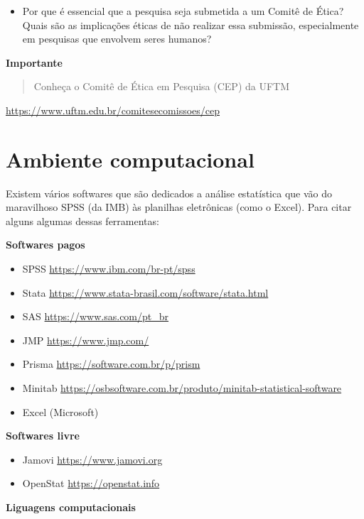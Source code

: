 \documentclass[
]{book}
\providecommand{\tightlist}{%
  \setlength{\itemsep}{0pt}\setlength{\parskip}{0pt}}
\begin{document}
\begin{enumerate}
  \begin{itemize}
  \tightlist
  \item
    Por que é essencial que a pesquisa seja submetida a um Comitê de Ética? Quais são as implicações éticas de não realizar essa submissão, especialmente em pesquisas que envolvem seres humanos?
  \end{itemize}
\end{enumerate}

\textbf{Importante}

\begin{quote}
Conheça o Comitê de Ética em Pesquisa (CEP) da UFTM
\end{quote}

\url{https://www.uftm.edu.br/comitesecomissoes/cep}

\chapter{Ambiente computacional}\label{ambiente-computacional}

Existem vários softwares que são dedicados a análise estatística que vão do maravilhoso SPSS (da IMB) às planilhas eletrônicas (como o Excel). Para citar alguns algumas dessas ferramentas:

\textbf{Softwares pagos}

\begin{itemize}
\item
  SPSS \url{https://www.ibm.com/br-pt/spss}
\item
  Stata \url{https://www.stata-brasil.com/software/stata.html}
\item
  SAS \url{https://www.sas.com/pt_br}
\item
  JMP \url{https://www.jmp.com/}
\item
  Prisma \url{https://software.com.br/p/prism}
\item
  Minitab \url{https://osbsoftware.com.br/produto/minitab-statistical-software}
\item
  Excel (Microsoft)
\end{itemize}

\textbf{Softwares livre}

\begin{itemize}
\item
  Jamovi \url{https://www.jamovi.org}
\item
  OpenStat \url{https://openstat.info}
\end{itemize}

\textbf{Liguagens computacionais}
\end{document}
